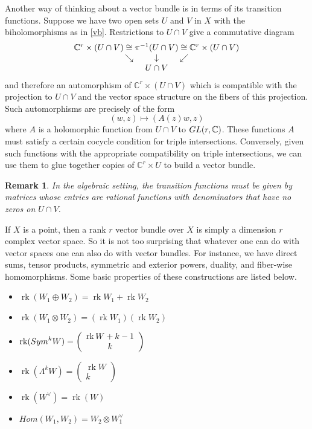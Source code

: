 \documentclass[11pt]{article}
\numberwithin{equation}{section}
\numberwithin{footnote}{section}
\newtheorem{rem}[thm]{Remark}
\newcommand{\blue}{\color{blue}}
\newcommand{\C}{{\mathbb C}}
\DeclareMathOperator{\rk}{rk}
\begin{document}
\smallskip
Another way of thinking about a vector bundle is in terms of its {\blue transition functions}. Suppose we have two open sets $U$ and $V$ in $X$ with the biholomorphisms as in \eqref{vb}. Restrictions to $U\cap V$ give a commutative diagram
$$
\begin{array}{c}
 \C^r\times (U\cap V)\cong\pi^{-1}(U\cap V)   \cong\C^r\times (U\cap V)\\
\searrow \hskip 25pt \downarrow \hskip 25pt\swarrow \\ 
U\cap V
\end{array}
$$
and therefore an automorphism of $\C^r\times (U\cap V)$ which is compatible with the projection to $U\cap V$ and the vector space structure on the fibers of this projection. Such automorphisms are precisely of the form
$$
(w,z)\mapsto (A(z)w,z)
$$
where $A$ is a holomorphic function from $U\cap V$ to ${\rm GL}(r,\C)$. These functions $A$ must satisfy a certain cocycle condition for triple intersections. Conversely, given such functions with the appropriate compatibility on triple intersections, we can use them to glue together copies of $\C^r\times U$ to build a vector bundle.

\smallskip
\begin{rem}
In the algebraic setting, the transition functions must be given by matrices whose entries are rational functions with denominators that have no zeros on $U\cap V$.
\end{rem}

\smallskip
If $X$ is a point, then a rank $r$ vector bundle over $X$ is simply a dimension $r$ complex vector space. So it is not too surprising that whatever one can do with vector spaces one can also do with  vector bundles. For instance, we have direct sums, tensor products, symmetric and exterior powers, duality, and fiber-wise homomorphisms. Some basic properties of these constructions are listed below.
\begin{itemize}
\item
 $\rk(W_1\oplus W_2) = \rk W_1 + \rk W_2$

\item
$\rk(W_1\otimes W_2) =( \rk W_1 )( \rk W_2)$

\item
$\rk({\rm Sym}^k W) = \left(\begin{array}{c} {{\rk W}+k-1}\\{k}\end{array}\right)$

\item
$\rk(\Lambda^k W) = \left(\begin{array}{c} {{\rk W}}\\{k}\end{array}\right)$

\item 
$\rk(W^\vee) = \rk (W)$

\item
$Hom(W_1,W_2) = W_2 \otimes W_1^\vee$
\end{itemize}
\end{document}

